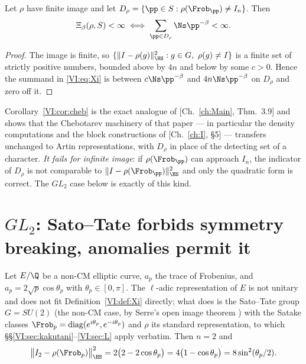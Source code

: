 \begin{corollary}\label{VI:cor:cheb}
Let $\rho$ have finite image and let $D_\rho=\{\pp\in S:\rho(\Frob_\pp)\ne I_n\}$. Then
\[
\Xi_\beta(\rho,S)<\infty\iff\sum_{\pp\in D_\rho}\Ns\pp^{-\beta}<\infty .
\]
\end{corollary}

\begin{proof}
The image is finite, so $\{\|I-\rho(g)\|_{\HS}^2:g\in G,\ \rho(g)\ne I\}$ is a finite set of
strictly positive numbers, bounded above by $4n$ and below by some $c>0$. Hence the summand
in \eqref{VI:eq:Xi} is between $c\Ns\pp^{-\beta}$ and $4n\Ns\pp^{-\beta}$ on $D_\rho$ and zero
off it.
\end{proof}

\begin{remark}
Corollary~\ref{VI:cor:cheb} is the exact analogue of [Ch.~\ref{ch:Main}, Thm.~3.9] and shows that the
Chebotarev machinery of that paper --- in particular the density computations and the block
constructions of [Ch.~\ref{ch:I}, \S5] --- transfers unchanged to Artin representations, with
$D_\rho$ in place of the detecting set of a character. \emph{It fails for infinite image}:
if $\rho(\Frob_\pp)$ can approach $I_n$, the indicator of $D_\rho$ is not comparable to
$\|I-\rho(\Frob_\pp)\|_{\HS}^2$ and only the quadratic form is correct. The $GL_2$ case below
is exactly of this kind.
\end{remark}

\section{$GL_2$: Sato--Tate forbids symmetry breaking, anomalies permit it}

Let $E/\Q$ be a non-CM elliptic curve, $a_p$ the trace of Frobenius, and
$a_p=2\sqrt p\cos\theta_p$ with $\theta_p\in[0,\pi]$. The $\ell$-adic representation of $E$
is not unitary and does not fit Definition~\ref{VI:def:Xi} directly; what does is the
Sato--Tate group $G=SU(2)$ (the non-CM case, by Serre's open image theorem \cite{Serre})
with the Satake classes $\Frob_p=\mathrm{diag}(e^{i\theta_p},e^{-i\theta_p})$ and $\rho$
its standard representation, to which \S\S\ref{VI:sec:kakutani}--\ref{VI:sec:L} apply verbatim.
Then $n=2$ and
\begin{equation}\label{VI:eq:ST}
\bigl\|I_2-\rho(\Frob_p)\bigr\|_{\HS}^2=2\bigl(2-2\cos\theta_p\bigr)=4\bigl(1-\cos\theta_p\bigr)=8\sin^2(\theta_p/2).
\end{equation}


